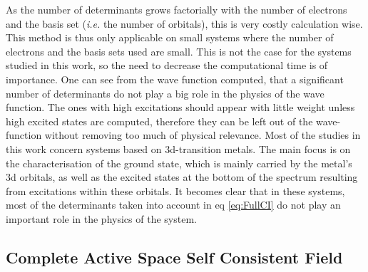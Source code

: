 \documentclass[12pt]{report}
\numberwithin{equation}{section}
\begin{document}
As the number of determinants grows factorially with the number of electrons and the basis set (\textit{i.e.} the number of orbitals), this is very costly calculation wise.
This method is thus only applicable on small systems where the number of electrons and the basis sets used are small.
This is not the case for the systems studied in this work, so the need to decrease the computational time is of importance.
One can see from the wave function computed, that a significant number of determinants do not play a big role in the physics of the wave function.
The ones with high excitations should appear with little weight unless high excited states are computed, therefore they can be left out of the wave-function without removing too much of physical relevance. 
Most of the studies in this work concern systems based on 3d-transition metals.
The main focus is on the characterisation of the ground state, which is mainly carried by the metal's 3d orbitals, as well as the excited states at the bottom of the spectrum resulting from excitations within these orbitals.
It becomes clear that in these systems, most of the determinants taken into account in eq \ref{eq:FullCI} do not play an important role in the physics of the system.



\subsection{Complete Active Space Self Consistent Field}
\end{document}
